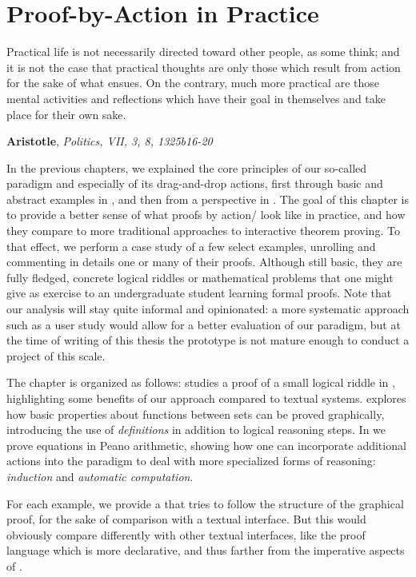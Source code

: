 \setchapterpreamble[u]{\margintoc}
\chapter{Proof-by-Action in Practice}

\epigraph{Practical life is not necessarily directed toward other people, as
some think; and it is not the case that practical thoughts are only those which
result from action for the sake of what ensues. On the contrary, much more
practical are those mental activities and reflections which have their goal in
themselves and take place for their own sake.}{\textbf{Aristotle},
\textit{Politics, VII, 3, 8, 1325b16-20}}

In the previous chapters, we explained the core principles of our so-called
 paradigm and especially of its drag-and-drop actions, first
through basic and abstract examples in , and then from a
 perspective in . The goal of this chapter is
to provide a better sense of what proofs by action/ look like in
practice, and how they compare to more traditional approaches to interactive
theorem proving. To that effect, we perform a case study of a few select
examples, unrolling and commenting in details one or many of their proofs.
Although still basic, they are fully fledged, concrete logical riddles or
mathematical problems that one might give as exercise to an undergraduate
student learning formal proofs. Note that our analysis will stay quite informal
and opinionated: a more systematic approach such as a user study would allow for
a better evaluation of our paradigm, but at the time of writing of this thesis
the  prototype is not mature enough to conduct a project of this
scale.

The chapter is organized as follows:  studies a proof of a small
logical riddle in , highlighting some benefits of our approach
compared to textual systems.  explores how basic properties about
functions between sets can be proved graphically, introducing the use of
\emph{definitions} in addition to logical reasoning steps. In  we
prove equations in Peano arithmetic, showing how one can incorporate additional
actions into the paradigm to deal with more specialized forms of reasoning:
\emph{induction} and \emph{automatic computation}.

\begin{kaonote}
  For each example, we provide a   that tries to follow
  the structure of the graphical proof, for the sake of comparison with a
  textual interface. But this would obviously compare differently with other
  textual interfaces, like the  proof language which is more
  declarative, and thus farther from the imperative aspects of .
\end{kaonote}
  
